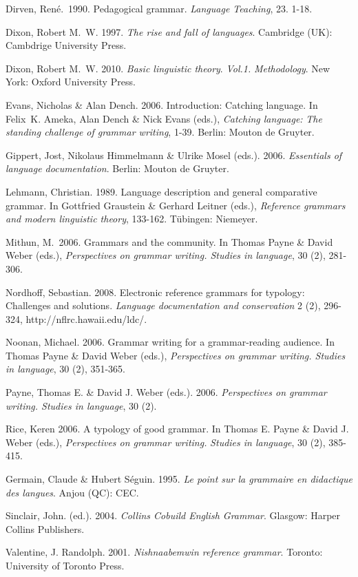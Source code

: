 \documentclass[letterpaper]{article}
\begin{document}
Dirven, Ren\'e.~1990. Pedagogical grammar. \textit{Language Teaching}, 23. 1-18.

Dixon, Robert M.~W. 1997. \textit{The rise and fall of languages}. Cambridge (UK): Cambdrige University Press.

Dixon, Robert M.~W. 2010. \textit{Basic linguistic theory}. \textit{V}\textit{ol.1.} \textit{Methodology}. New York: Oxford University Press.

Evans, Nicholas \& Alan Dench. 2006. Introduction: Catching language. In Felix~K. Ameka, Alan Dench \& Nick Evans (eds.), \textit{Catching language}\textit{: }\textit{The standing challenge of grammar writing}, 1-39. Berlin: Mouton de Gruyter.

Gippert, Jost, Nikolaus Himmelmann \& Ulrike Mosel (eds.). 2006. \textit{Essentials of language documentation}. Berlin: Mouton de Gruyter.

Lehmann, Christian. 1989. Language description and general comparative grammar. In\textit{ }Gottfried Graustein \& Gerhard Leitner (eds.), \textit{Reference grammars }\textit{and modern linguistic theory}, 133-162. T\"ubingen: Niemeyer.

Mithun, M.~2006. Grammars and the community. In Thomas Payne \& David Weber (eds.), \textit{Perspectives on grammar writing. Studies in language}, 30 (2), 281-306.

Nordhoff, Sebastian. 2008. Electronic reference grammars for typology: Challenges and solutions. \textit{Language documentation and conservation} 2 (2), 296-324, http://nflrc.hawaii.edu/ldc/.

Noonan, Michael. 2006. Grammar writing for a grammar-reading audience. In Thomas Payne \& David Weber (eds.), \textit{Perspectives on grammar writing. Studies in language}, 30 (2), 351-365.

Payne, Thomas E. \& David J. Weber (eds.). 2006. \textit{Perspectives on grammar writing. Studies in language}, 30 (2).

Rice, Keren 2006. A typology of good grammar. In Thomas E. Payne \& David J. Weber (eds.), \textit{Perspectives on grammar writing. }\textit{Studies in language}, 30 (2), 385-415.

Germain, Claude \& Hubert S\'eguin. 1995. \textit{Le point sur la grammaire en didactique des langues}. Anjou (QC): CEC.

Sinclair, John. (ed.). 2004. \textit{Collins Cobuild English Grammar}. Glasgow: Harper Collins Publishers.

Valentine, J. Randolph. 2001. \textit{Nishnaabemwin reference grammar}. Toronto: University of Toronto Press.
\end{document}
